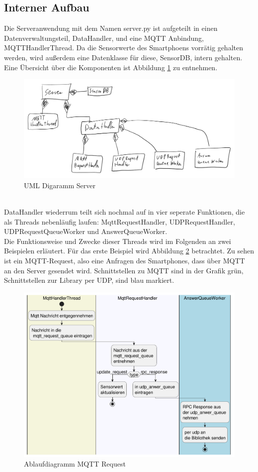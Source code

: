 \documentclass[11pt,a4paper]{report}
\begin{document}
\subsection{Interner Aufbau}
Die Serveranwendung mit dem Namen server.py ist aufgeteilt in einen Datenverwaltungsteil, DataHandler, und eine MQTT Anbindung, MQTTHandlerThread.
Da die Sensorwerte des Smartphoens vorrätig gehalten werden, wird außerdem eine Datenklasse für diese, SensorDB, intern gehalten.
Eine Übersicht über die Komponenten ist Abbildung \ref{fig:serverUml} zu entnehmen.
\begin{figure}[htbp]
  \centering
  \includegraphics[width=.8\textwidth]{images/ServerUml.png}
  \caption{UML Digaramm Server}
  \label{fig:serverUml}
\end{figure}
\\
DataHandler wiederrum teilt sich nochmal auf in vier seperate Funktionen, die als Threads nebenläufig laufen: MqttRequestHandler, UDPRequestHandler, UDPRequestQueueWorker und AnswerQueueWorker.
\\
Die Funktionsweise und Zwecke dieser Threads wird im Folgenden an zwei Beispielen erläutert.
Für das erste Beispiel wird Abbildung \ref{fig:serverMqttReqPath} betrachtet.
Zu sehen ist ein MQTT-Request, also eine Anfragen des Smartphones, dass über MQTT an den Server gesendet wird.
Schnittstellen zu MQTT sind in der Grafik grün, Schnittstellen zur Library per UDP, sind blau markiert.
\begin{figure}[htbp]
  \centering
  \includegraphics[width=.8\textwidth]{images/MqttRequestServerPath}
  \caption{Ablaufdiagramm MQTT Request}
  \label{fig:serverMqttReqPath}
\end{figure}
\end{document}
